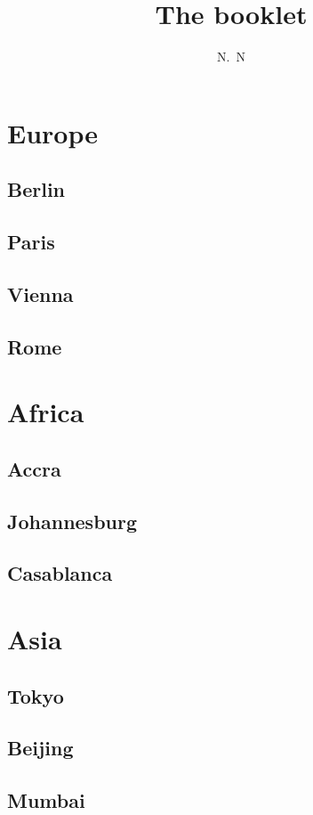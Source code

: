 \documentclass[12pt]{article}
\author{N.~N}
\title{The booklet}
\begin{document}
\maketitle

\tableofcontents

\section{Europe}
\subsection{Berlin}
\lipsum[4]
\subsection{Paris}
\lipsum[1-3]
\subsection{Vienna}
\lipsum[10]
\subsection{Rome}
\lipsum[15]
\section{Africa}
\lipsum[1-4]
\subsection{Accra}
\lipsum[5-8]
\subsection{Johannesburg}
\lipsum[9-11]
\subsection{Casablanca}
\lipsum[11-12]
\lipsum[5-6]
\section{Asia}
\lipsum[1-4]
\subsection{Tokyo}
\lipsum[5-8]
\subsection{Beijing}
\lipsum[9-11]
\subsection{Mumbai}
\lipsum[11-12]
\lipsum[5-6]
\end{document}
